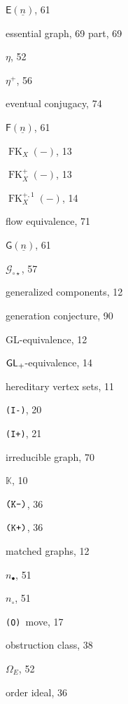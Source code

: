 \documentclass[12pt]{amsbook}%
\theoremstyle{defin}
\theoremstyle{remark}
\numberwithin{equation}{chapter}
\numberwithin{theor}{section}
\newcommand{\nn}{\underline{n}}
\newcommand{\K}{\mathbb{K}}
\newcommand{\IIIm}{\mbox{\texttt{\textup{(I-)}}}}
\newcommand{\IIIp}{\mbox{\texttt{\textup{(I+)}}}}
\newcommand{\OOO}{\mbox{\texttt{\textup{(O)}}}}
\newcommand{\KKKp}{\mbox{\texttt{\textup{(K+)}}}}
\newcommand{\KKKm}{\mbox{\texttt{\textup{(K-)}}}}
\newcommand{\singgen}{\mathcal G_{\circ\star}}
\newcommand{\GF}{{\mathsf F}}
\newcommand{\GC}{{\mathsf E}}
\newcommand{\GO}{{\mathsf G}}
\newcommand{\FKX}{\operatorname{FK}_X}
\newcommand{\FKXp}{\operatorname{FK}_X^+}
\newcommand{\FKXpu}{\operatorname{FK}_X^{+,1}}
\newcommand{\GL}{{\sf GL}}
\newcommand{\GLp}{\mbox{${\sf GL}_+$}}
\newcommand{\regX}{{\bullet}}
\newcommand{\singX}{{\circ}}
\newcommand{\nos}{{n_\singX}}
\newcommand{\nor}{{n_\regX}}
\newcommand{\nDT}{\Omega}
\begin{document}
\begin{theindex}
  \indexspace

  \item $\GC(\nn)$, 61
  \item essential
    \subitem graph, 69
    \subitem part, 69
  \item $\eta$, 52
  \item $\eta^+$, 56
  \item eventual conjugacy, 74

  \indexspace

  \item $\GF(\nn)$, 61
  \item $\FKX(-)$, 13
  \item $\FKXp(-)$, 13
  \item $\FKXpu(-)$, 14
  \item flow equivalence, 71

  \indexspace

  \item $\GO(\nn)$, 61
  \item $\singgen$, 57
  \item generalized components, 12
  \item generation conjecture, 90
  \item \GL-equivalence, 12
  \item $\GLp$-equivalence, 14

  \indexspace

  \item hereditary vertex sets, 11

  \indexspace

  \item \IIIm, 20
  \item \IIIp, 21
  \item irreducible graph, 70

  \indexspace

  \item $\K$, 10
  \item $\KKKm$, 36
  \item $\KKKp$, 36

  \indexspace

  \item matched graphs, 12

  \indexspace

  \item $\nor$, 51
  \item $\nos$, 51

  \indexspace

  \item \OOO\ move, 17
  \item obstruction class, 38
  \item $\nDT_E$, 52
  \item order ideal, 36


\end{theindex}
\end{document}

